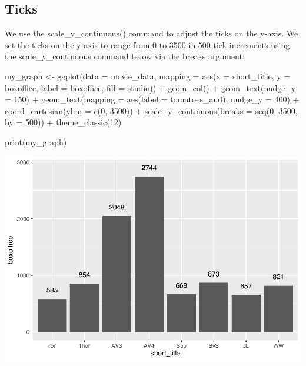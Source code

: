 \documentclass[
]{krantz}
\makeatletter
\newenvironment{Shaded}{\begin{snugshade}}{\end{snugshade}}
\newcommand{\AttributeTok}[1]{\textcolor[rgb]{0.61,0.61,0.61}{#1}}
\newcommand{\DecValTok}[1]{\textcolor[rgb]{0.06,0.06,0.06}{#1}}
\newcommand{\FunctionTok}[1]{\textcolor[rgb]{0,0,0}{#1}}
\newcommand{\NormalTok}[1]{#1}
\newcommand{\OtherTok}[1]{\textcolor[rgb]{0.37,0.37,0.37}{#1}}
\newcommand{\SpecialCharTok}[1]{\textcolor[rgb]{0,0,0}{#1}}
\newenvironment{kframe}{%
\medskip{}
\setlength{\fboxsep}{.8em}
 \def\at@end@of@kframe{}%
 \ifinner\ifhmode%
  \def\at@end@of@kframe{\end{minipage}}%
  \begin{minipage}{\columnwidth}%
 \fi\fi%
 \def\FrameCommand##1{\hskip\@totalleftmargin \hskip-\fboxsep
 \colorbox{shadecolor}{##1}\hskip-\fboxsep
     \hskip-\linewidth \hskip-\@totalleftmargin \hskip\columnwidth}%
 \MakeFramed {\advance\hsize-\width
   \@totalleftmargin\z@ \linewidth\hsize
   \@setminipage}}%
 {\par\unskip\endMakeFramed%
 \at@end@of@kframe}
\renewenvironment{Shaded}{\begin{kframe}}{\end{kframe}}
\makeatother
\begin{document}
\hypertarget{ticks}{%
\subsection{Ticks}\label{ticks}}

We use the scale\_y\_continuous() command to adjust the ticks on the y-axis. We set the ticks on the y-axis to range from 0 to 3500 in 500 tick increments using the scale\_y\_continuous command below via the breaks argument:

\begin{Shaded}
\begin{Highlighting}[]
\NormalTok{my\_graph }\OtherTok{\textless{}{-}} \FunctionTok{ggplot}\NormalTok{(}\AttributeTok{data =}\NormalTok{ movie\_data,}
           \AttributeTok{mapping =} \FunctionTok{aes}\NormalTok{(}\AttributeTok{x =}\NormalTok{ short\_title,}
                         \AttributeTok{y =}\NormalTok{ boxoffice,}
                         \AttributeTok{label =}\NormalTok{ boxoffice, }
                         \AttributeTok{fill =}\NormalTok{ studio)) }\SpecialCharTok{+}
  \FunctionTok{geom\_col}\NormalTok{() }\SpecialCharTok{+}
  \FunctionTok{geom\_text}\NormalTok{(}\AttributeTok{nudge\_y =} \DecValTok{150}\NormalTok{)  }\SpecialCharTok{+}
  \FunctionTok{geom\_text}\NormalTok{(}\AttributeTok{mapping =} \FunctionTok{aes}\NormalTok{(}\AttributeTok{label =}\NormalTok{ tomatoes\_aud), }
            \AttributeTok{nudge\_y =} \DecValTok{400}\NormalTok{) }\SpecialCharTok{+}
  \FunctionTok{coord\_cartesian}\NormalTok{(}\AttributeTok{ylim =} \FunctionTok{c}\NormalTok{(}\DecValTok{0}\NormalTok{, }\DecValTok{3500}\NormalTok{)) }\SpecialCharTok{+}
  \FunctionTok{scale\_y\_continuous}\NormalTok{(}\AttributeTok{breaks =} \FunctionTok{seq}\NormalTok{(}\DecValTok{0}\NormalTok{, }\DecValTok{3500}\NormalTok{, }\AttributeTok{by =} \DecValTok{500}\NormalTok{)) }\SpecialCharTok{+}
  \FunctionTok{theme\_classic}\NormalTok{(}\DecValTok{12}\NormalTok{)}

\FunctionTok{print}\NormalTok{(my\_graph)}
\end{Highlighting}
\end{Shaded}

\includegraphics[width=0.65\linewidth]{bookdown_files/figure-latex/unnamed-chunk-116-1}
\end{document}
